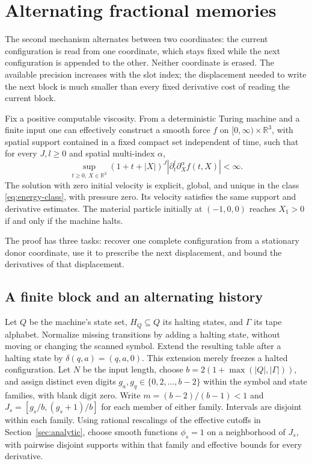 \section{Alternating fractional memories}
\label{sec:alternating}

The second mechanism alternates between two coordinates: the current
configuration is read from one coordinate, which stays fixed while the
next configuration is appended to the other.
Neither coordinate is erased.  The available precision increases with
the slot index; the displacement needed to write the next block is much
smaller than every fixed derivative cost of reading the current block.

\begin{theorem}
\label{thm:alternating}
Fix a positive computable viscosity. From a deterministic Turing machine
and a finite input one can effectively
construct a smooth force $f$ on $[0,\infty)\times\mathbb R^3$, with
spatial support contained in a fixed compact set independent of time,
such that for every $J,l\geq0$ and spatial multi-index $\alpha$,
\begin{equation}
 \sup_{t\geq0,\,X\in\mathbb R^3}
 (1+t+|X|)^J
 |\partial_t^l\partial_X^\alpha f(t,X)|<\infty.
 \label{eq:alternating-schwartz}
\end{equation}
The solution with zero initial velocity is explicit, global, and unique
in the class \eqref{eq:energy-class}, with pressure zero.  Its velocity satisfies
the same support and derivative estimates.  The material particle
initially at $(-1,0,0)$ reaches $X_1>0$ if and only if the machine halts.
\end{theorem}

The proof has three tasks: recover one complete configuration from a
stationary donor coordinate, use it to prescribe the next displacement,
and bound the derivatives of that displacement.

\subsection{A finite block and an alternating history}
Let $Q$ be the machine's state set, $H_Q\subseteq Q$ its halting states,
and $\Gamma$ its tape alphabet. Normalize missing transitions by adding
a halting state, without moving or changing the scanned symbol.
Extend the resulting table after a halting state by
$\delta(q,a)=(q,a,0)$.  This extension merely freezes a halted
configuration.  Let $N$ be the input length, choose
$b=2(1+\max(|Q|,|\Gamma|))$, and assign distinct even digits
$g_a,g_q\in\{0,2,\ldots,b-2\}$ within the symbol and state families,
with blank digit zero.  Write
$m=(b-2)/(b-1)<1$ and
$J_s=[g_s/b,(g_s+1)/b]$ for each member of either family.
Intervals are disjoint within each family.  Using rational rescalings
of the effective cutoffs in Section~\ref{sec:analytic}, choose smooth functions
$\phi_s=1$ on a neighborhood of $J_s$, with pairwise disjoint supports
within that family and effective bounds for every derivative.

